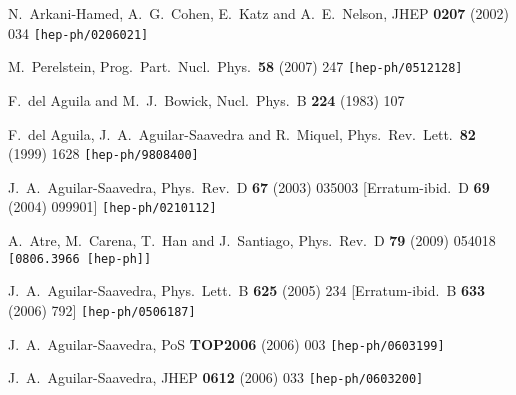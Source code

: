 \documentclass[12pt,a4paper]{article}
\begin{document}
\begin{thebibliography}{99}
  N.~Arkani-Hamed, A.~G.~Cohen, E.~Katz and A.~E.~Nelson,
  JHEP {\bf 0207} (2002) 034
  {\tt [hep-ph/0206021]}

  M.~Perelstein,
  Prog.\ Part.\ Nucl.\ Phys.\  {\bf 58} (2007) 247
  {\tt [hep-ph/0512128]}



  F.~del Aguila and M.~J.~Bowick,
  Nucl.\ Phys.\  B {\bf 224} (1983) 107

  F.~del Aguila, J.~A.~Aguilar-Saavedra and R.~Miquel,
  Phys.\ Rev.\ Lett.\  {\bf 82} (1999) 1628
  {\tt [hep-ph/9808400]}

  J.~A.~Aguilar-Saavedra,
  Phys.\ Rev.\  D {\bf 67} (2003) 035003
  [Erratum-ibid.\  D {\bf 69} (2004) 099901]
  {\tt [hep-ph/0210112]}

  A.~Atre, M.~Carena, T.~Han and J.~Santiago,
  Phys.\ Rev.\  D {\bf 79} (2009) 054018
  {\tt [0806.3966 [hep-ph]]}


  J.~A.~Aguilar-Saavedra,
  Phys.\ Lett.\  B {\bf 625} (2005) 234
  [Erratum-ibid.\  B {\bf 633} (2006) 792]
  {\tt [hep-ph/0506187]}

  J.~A.~Aguilar-Saavedra,
  PoS {\bf TOP2006} (2006) 003
  {\tt [hep-ph/0603199]}

  J.~A.~Aguilar-Saavedra,
  JHEP {\bf 0612} (2006) 033
  {\tt [hep-ph/0603200]}


\end{thebibliography}
\end{document}
